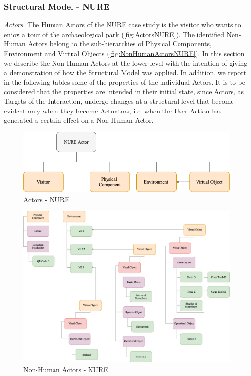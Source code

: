 \subsubsection*{Structural Model - NURE}

\emph{Actors}. The Human Actors of the NURE case study is the visitor who wants to enjoy a tour of the archaeological park (\autoref{fig:ActorsNURE}). The identified Non-Human Actors belong to the sub-hierarchies of Physical Components, Environment and Virtual Objects (\autoref{fig:NonHumanActorsNURE}). In this section we describe the Non-Human Actors at the lower level with the intention of giving a demonstration of how the Structural Model was applied. In addition, we report in the following tables some of the properties of the individual Actors. It is to be considered that the properties are intended in their initial state, since Actors, as Targets of the Interaction, undergo changes at a structural level that become evident only when they become Actuators, i.e. when the User Action has generated a certain effect on a Non-Human Actor.

\begin{figure}[H]
	\centering
	\includegraphics[width=14cm]{Figures/Conceptual Model/SM_NURE1.png}
	\caption{Actors - NURE}
	\label{fig:ActorsNURE}
\end{figure}

\begin{figure}[H]
	\centering
	\includegraphics[width=14cm]{Figures/Conceptual Model/SM_NURE2.png}
	\caption{Non-Human Actors - NURE}
	\label{fig:NonHumanActorsNURE}
\end{figure}

